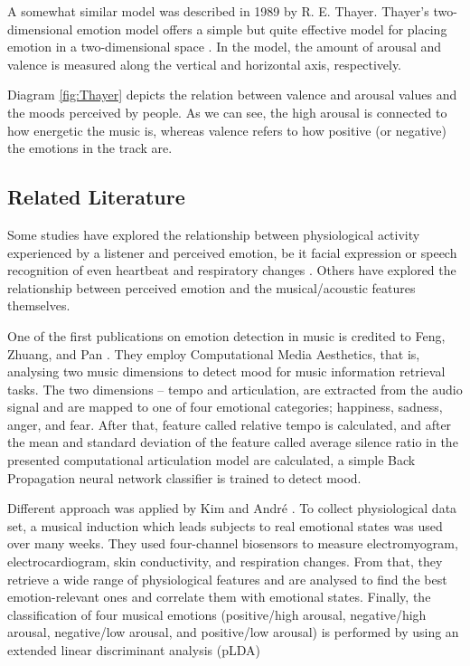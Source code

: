 A somewhat similar model was described in 1989 by R. E. Thayer. Thayer’s two-dimensional emotion model offers a simple but quite effective model for placing emotion in a two-dimensional space \cite{Thayer}. In the model, the amount of arousal and valence is measured along the vertical and horizontal axis, respectively.

Diagram \ref{fig:Thayer} depicts the relation between valence and arousal values and the moods perceived by people. As we can see, the high arousal is connected to how energetic the music is, whereas valence refers to how positive (or negative) the emotions in the track are. 




\subsection{Related Literature}

Some studies have explored the relationship between physiological activity experienced by a listener and perceived emotion, be it facial expression or speech recognition of even heartbeat and respiratory changes \cite{physicalmood}.
Others have explored the relationship between perceived emotion and the musical/acoustic features themselves.


One of the first publications on emotion detection in music is credited to Feng, Zhuang, and Pan \cite{moodold}. They employ Computational Media Aesthetics, that is, analysing two music dimensions to detect mood for music information retrieval tasks. The two dimensions -- tempo and articulation, are extracted from the audio signal and are mapped to one of four emotional categories; happiness, sadness, anger, and fear. 
After that, feature called relative tempo is calculated, and after the mean and standard deviation of the feature called average silence ratio in the presented computational articulation model are calculated, a simple Back Propagation neural network classifier is trained to detect mood.

Different approach was applied by Kim and Andr\'{e} \cite{physicalmood}. To collect physiological data set, a musical induction which leads subjects to real emotional states was used over many weeks. They used four-channel biosensors to measure electromyogram, electrocardiogram, skin conductivity, and respiration changes. From that, they retrieve a wide range of physiological features and are analysed to find the best emotion-relevant ones and correlate them with emotional states. Finally, the classification of four musical emotions (positive/high arousal, negative/high arousal, negative/low arousal, and positive/low arousal) is performed by using an extended linear discriminant analysis (pLDA)



